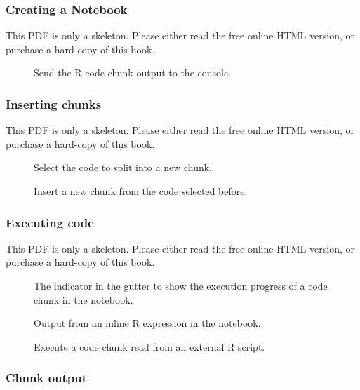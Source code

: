 \documentclass[
  11pt,
]{krantz}
\theoremstyle{definition}
\theoremstyle{definition}
\theoremstyle{definition}
\theoremstyle{definition}
\theoremstyle{remark}
\begin{document}
\subsubsection{Creating a Notebook}\label{creating-a-notebook}

This PDF is only a skeleton. Please either read the free online HTML version, or purchase a hard-copy of this book.

\begin{figure}\caption{Send the R code chunk output to the console.}\end{figure}

\subsubsection{Inserting chunks}\label{inserting-chunks}

This PDF is only a skeleton. Please either read the free online HTML version, or purchase a hard-copy of this book.

\begin{figure}\caption{Select the code to split into a new chunk.}\end{figure}

\begin{figure}\caption{Insert a new chunk from the code selected before.}\end{figure}

\subsubsection{Executing code}\label{executing-code}

This PDF is only a skeleton. Please either read the free online HTML version, or purchase a hard-copy of this book.

\begin{figure}\caption{The indicator in the gutter to show the execution progress of a code chunk in the notebook.}\end{figure}

\begin{figure}\caption{Output from an inline R expression in the notebook.}\end{figure}

\begin{figure}\caption{Execute a code chunk read from an external R script.}\end{figure}

\subsubsection{Chunk output}\label{chunk-output}
\end{document}
